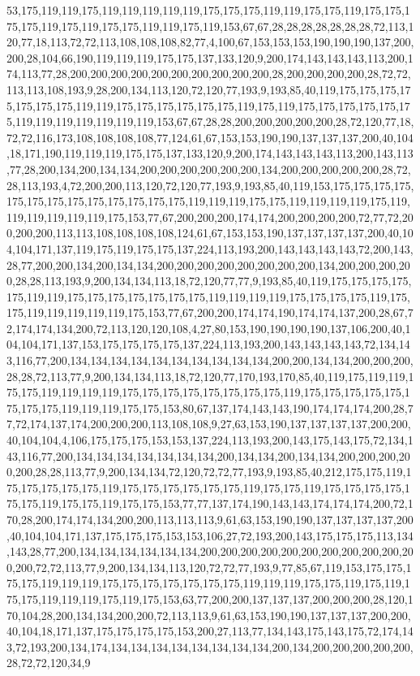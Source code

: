 53,175,119,119,175,119,119,119,119,119,175,175,175,119,119,175,175,119,175,175,175,175,119,175,119,175,175,119,119,175,119,153,67,67,28,28,28,28,28,28,28,72,113,120,77,18,113,72,72,113,108,108,108,82,77,4,100,67,153,153,153,190,190,190,137,200,200,28,104,66,190,119,119,119,175,175,137,133,120,9,200,174,143,143,143,113,200,174,113,77,28,200,200,200,200,200,200,200,200,200,200,28,200,200,200,200,28,72,72,113,113,108,193,9,28,200,134,113,120,72,120,77,193,9,193,85,40,119,175,175,175,175,175,175,175,119,119,175,175,175,175,175,175,119,175,119,175,175,175,175,175,175,119,119,119,119,119,119,119,153,67,67,28,28,200,200,200,200,200,28,72,120,77,18,72,72,116,173,108,108,108,108,77,124,61,67,153,153,190,190,137,137,137,200,40,104,18,171,190,119,119,119,175,175,137,133,120,9,200,174,143,143,143,113,200,143,113,77,28,200,134,200,134,134,200,200,200,200,200,200,134,200,200,200,200,200,28,72,28,113,193,4,72,200,200,113,120,72,120,77,193,9,193,85,40,119,153,175,175,175,175,175,175,175,175,175,175,175,175,175,119,119,119,175,175,119,119,119,119,175,119,119,119,119,119,119,175,153,77,67,200,200,200,174,174,200,200,200,200,72,77,72,200,200,200,113,113,108,108,108,108,124,61,67,153,153,190,137,137,137,137,200,40,104,104,171,137,119,175,119,175,175,137,224,113,193,200,143,143,143,143,72,200,143,28,77,200,200,134,200,134,134,200,200,200,200,200,200,200,200,134,200,200,200,200,28,28,113,193,9,200,134,134,113,18,72,120,77,77,9,193,85,40,119,175,175,175,175,175,119,119,175,175,175,175,175,175,175,119,119,119,119,175,175,175,175,119,175,175,119,119,119,119,119,175,153,77,67,200,200,174,174,190,174,174,137,200,28,67,72,174,174,134,200,72,113,120,120,108,4,27,80,153,190,190,190,190,137,106,200,40,104,104,171,137,153,175,175,175,175,137,224,113,193,200,143,143,143,143,72,134,143,116,77,200,134,134,134,134,134,134,134,134,134,134,200,200,134,134,200,200,200,28,28,72,113,77,9,200,134,134,113,18,72,120,77,170,193,170,85,40,119,175,119,119,175,175,119,119,119,119,175,175,175,175,175,175,175,175,119,175,175,175,175,175,175,175,175,119,119,119,175,175,153,80,67,137,174,143,143,190,174,174,174,200,28,77,72,174,137,174,200,200,200,113,108,108,9,27,63,153,190,137,137,137,137,200,200,40,104,104,4,106,175,175,175,153,153,137,224,113,193,200,143,175,143,175,72,134,143,116,77,200,134,134,134,134,134,134,134,200,134,134,200,134,134,200,200,200,200,200,28,28,113,77,9,200,134,134,72,120,72,72,77,193,9,193,85,40,212,175,175,119,175,175,175,175,175,119,175,175,175,175,175,175,119,175,175,119,175,175,175,175,175,175,119,175,175,119,175,175,153,77,77,137,174,190,143,143,174,174,174,200,72,170,28,200,174,174,134,200,200,113,113,113,9,61,63,153,190,190,137,137,137,137,200,40,104,104,171,137,175,175,175,153,153,106,27,72,193,200,143,175,175,175,113,134,143,28,77,200,134,134,134,134,134,134,200,200,200,200,200,200,200,200,200,200,200,200,72,72,113,77,9,200,134,134,113,120,72,72,77,193,9,77,85,67,119,153,175,175,175,175,119,119,119,175,175,175,175,175,175,175,119,119,119,175,175,119,175,119,175,175,119,119,119,175,119,175,153,63,77,200,200,137,137,137,200,200,200,28,120,170,104,28,200,134,134,200,200,72,113,113,9,61,63,153,190,190,137,137,137,200,200,40,104,18,171,137,175,175,175,175,153,200,27,113,77,134,143,175,143,175,72,174,143,72,193,200,134,174,134,134,134,134,134,134,134,134,200,134,200,200,200,200,200,28,72,72,120,34,9